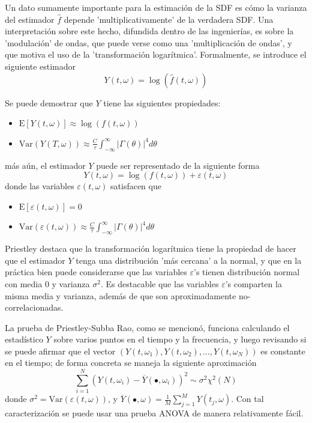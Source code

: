 \documentclass[12pt,a4paper]{mitthesis}
\newcommand{\intR}{\int_{-\infty}^{\infty}}
\newcommand{\est}[1]{\widehat{ #1 }}
\newcommand{\E}[1]{\mathrm{E}\left[ #1 \right]}
\newcommand{\Var}[1]{\mathrm{Var}\left( #1 \right)}
\newcommand{\abso}[1]{\left| #1 \right|}
\begin{document}
Un dato sumamente importante para la estimaci\'on de la SDF es c\'omo la varianza del estimador 
$\widehat{f}$ depende 'multiplicativamente' de la verdadera SDF.
Una interpretaci\'on sobre este hecho, difundida dentro de las ingenier\'ias, es sobre la 
'modulaci\'on' de ondas, que puede verse como una 'multiplicaci\'on de ondas', y que motiva el uso 
de la 'transformaci\'on logar\'itmica'.
Formalmente, se introduce el siguiente estimador
\begin{equation*}
Y(t,\omega) = \log{\left( \est{f}(t,\omega)\right)}
\end{equation*}

Se puede demostrar que $Y$ tiene las siguientes propiedades:
\begin{itemize}
\item $\displaystyle 
\E{ Y(t,\omega) } \approx \log \left( f(t,\omega) \right)$
\item $\displaystyle 
\Var{ Y(T,\omega) } 
\approx \frac{C}{\tau} \intR \abso{\Gamma (\theta)}^{4} d\theta $
\end{itemize}
m\'as a\'un, el estimador $Y$ puede ser representado de la siguiente forma
\begin{equation*}
Y(t,\omega) = \log \left( f(t,\omega) \right) + \varepsilon(t,\omega)
\end{equation*}
donde las variables $\varepsilon(t,\omega)$ satisfacen que
\begin{itemize}
\item $\displaystyle \E{\varepsilon(t,\omega)} = 0$
\item $\displaystyle \Var{\varepsilon(t,\omega)}
\approx \frac{C}{\tau} \intR \abso{\Gamma (\theta)}^{4} d\theta$
\end{itemize}

Priestley \cite{Priestley81} destaca que la transformaci\'on logar\'itmica tiene la propiedad de 
hacer que el estimador $Y$ tenga una distribuci\'on 'm\'as cercana' a la normal, y que en la 
pr\'actica bien puede considerarse que las variables $\varepsilon$'s tienen distribuci\'on normal 
con media 0 y varianza $\sigma^{2}$.
Es destacable que las variables $\varepsilon$'s comparten la misma media y varianza, adem\'as de 
que son aproximadamente no-correlacionadas.

La prueba de Priestley-Subba Rao, como se mencion\'o, funciona calculando el estad\'istico $Y$ 
sobre varios puntos en el tiempo y la frecuencia, y luego revisando si se puede afirmar que el 
vector  $\left( Y(t,\omega_1), Y(t,\omega_2), \dots, Y(t,\omega_N) \right)$ es constante en el 
tiempo; de forma concreta  se maneja la siguiente aproximaci\'on
\begin{equation*}
\sum_{i = 1 }^{N} \left( Y(t,\omega_i) - \overline{Y}(\bullet,\omega_i) \right)^{2} 
\sim \sigma^{2} \chi^{2}(N)
\end{equation*}
donde $\sigma^{2} = \Var{\varepsilon(t,\omega)}$, y
$\overline{Y}(\bullet,\omega) = \frac{1}{M} \sum_{j=1}^{M} Y(t_j,\omega)$.
Con tal caracterizaci\'on se puede usar una prueba ANOVA de manera relativamente f\'acil.
\end{document}
